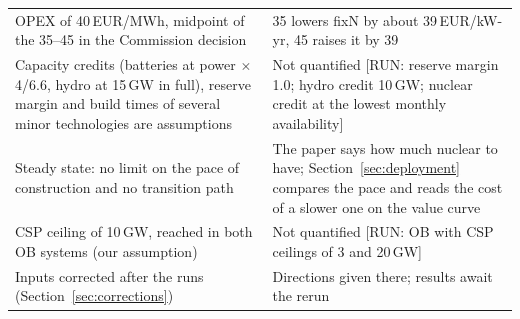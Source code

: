 \begin{table}[p]
\begin{tabularx}{\linewidth}{@{}P{7.6cm}L@{}}
OPEX of 40\,EUR/MWh, midpoint of the 35--45 in the Commission decision & 35 lowers fixN by about 39\,EUR/kW-yr, 45 raises it by 39\\
Capacity credits (batteries at power $\times$ 4/6.6, hydro at 15\,GW in full), reserve margin and build times of several minor technologies are assumptions & Not quantified [RUN: reserve margin 1.0; hydro credit 10\,GW; nuclear credit at the lowest monthly availability]\\
Steady state: no limit on the pace of construction and no transition path & The paper says how much nuclear to have; Section~\ref{sec:deployment} compares the pace and reads the cost of a slower one on the value curve\\
CSP ceiling of 10\,GW, reached in both OB systems (our assumption) & Not quantified [RUN: OB with CSP ceilings of 3 and 20\,GW]\\
Inputs corrected after the runs (Section~\ref{sec:corrections}) & Directions given there; results await the rerun\\
\bottomrule
\end{tabularx}
\end{table}
